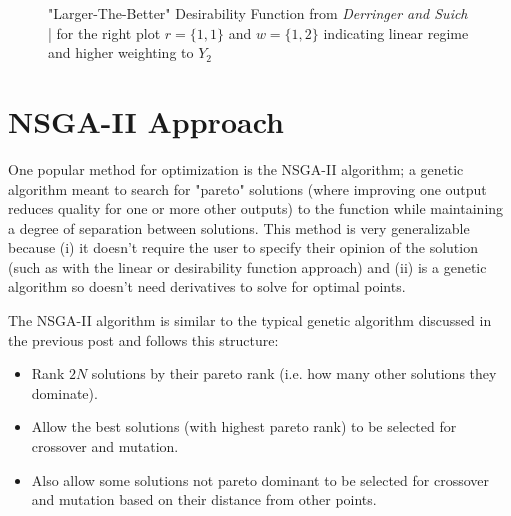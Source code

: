 \documentclass[12pt]{article}
\begin{document}
\begin{figure}[h]
\centering
{}
\caption{"Larger-The-Better" Desirability Function from \emph{Derringer and Suich} | for the right plot $r=\{1,1\}$ and $w=\{1,2\}$ indicating linear regime and higher weighting to $Y_2$}
\end{figure}

\section{NSGA-II Approach}

One popular method for optimization is the NSGA-II algorithm; a genetic algorithm meant to search for "pareto" solutions (where improving one output reduces quality for one or more other outputs) to the function while maintaining a degree of separation between solutions. This method is very generalizable because (i) it doesn't require the user to specify their opinion of the solution (such as with the linear or desirability function approach) and (ii) is a genetic algorithm so doesn't need derivatives to solve for optimal points.

\vspace{5mm}

The NSGA-II algorithm is similar to the typical genetic algorithm discussed in the previous post and follows this structure:

\begin{itemize}
	\item Rank $2N$ solutions by their pareto rank (i.e. how many other solutions they dominate).
	\item Allow the best solutions (with highest pareto rank) to be selected for crossover and mutation.
	\item Also allow some solutions not pareto dominant to be selected for crossover and mutation based on their distance from other points.
\end{itemize}
\end{document}
